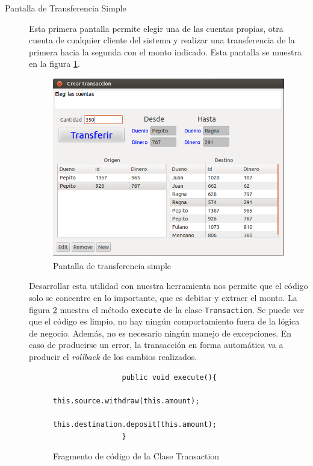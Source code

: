 \begin{description}

	\item[Pantalla de Transferencia Simple]
		Esta primera pantalla permite elegir una de las cuentas propias, otra cuenta
		de cualquier cliente del sistema y realizar una transferencia de la
		primera hacia la segunda con el monto indicado. Esta pantalla se
		muestra en la figura \ref{trasferenciaSimple}.
		
		\begin{figure}[!h]
			\centering
			\includegraphics[scale=0.45]{img/simple-transferencia}
			\caption{Pantalla de transferencia simple}
			\label{trasferenciaSimple}
		\end{figure}

		Desarrollar esta utilidad con nuestra herramienta nos permite que el código
		solo se concentre en lo importante, que es debitar y extraer el monto. 
		La figura \ref{executeTransaction} muestra el método  \lstinline|execute| de la
		clase \lstinline|Transaction|. 
		Se puede ver que el código es limpio, no hay ningún comportamiento fuera de la lógica
		de negocio. 
		Además, no es necesario ningún manejo de excepciones. En caso de producirse un error, 
		la transacción en forma automática va a producir el \emph{rollback} de los cambios realizados.

		\begin{figure}[!h]
			\begin{lstlisting}
				public void execute(){
					this.source.withdraw(this.amount);
					this.destination.deposit(this.amount);
				}
			\end{lstlisting}
			\caption{Fragmento de código de la Clase Transaction}
			\label{executeTransaction}
		\end{figure}
		 

\end{description}
